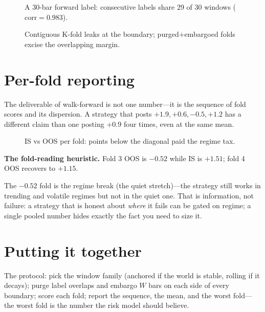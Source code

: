 \begin{figure}[htbp]\centering

\caption{A 30-bar forward label: consecutive labels share 29 of 30 windows
($\mathrm{corr}=0.983$).}
\label{fig:overlap}
\end{figure}

\begin{figure}[htbp]\centering

\caption{Contiguous K-fold leaks at the boundary; purged+embargoed folds excise the
overlapping margin.}
\label{fig:purge}
\end{figure}

\section{Per-fold reporting}\label{sec:folds}

The deliverable of walk-forward is not one number---it is the sequence of fold scores and
its dispersion. A strategy that posts $+1.9,+0.6,-0.5,+1.2$ has a different claim than
one posting $+0.9$ four times, even at the same mean.

\begin{figure}[htbp]\centering

\caption{IS vs OOS per fold: points below the diagonal paid the regime tax.}
\label{fig:folds}
\end{figure}

\begin{example}\label{ex:foldread}
\textbf{The fold-reading heuristic.} Fold 3 OOS is $-0.52$ while IS is $+1.51$; fold 4
OOS recovers to $+1.15$.
\begin{solution}
The $-0.52$ fold is the regime break (the quiet stretch)---the strategy still works in
trending and volatile regimes but not in the quiet one. That is information, not failure:
a strategy that is honest about \emph{where} it fails can be gated on regime; a single
pooled number hides exactly the fact you need to size it.
\end{solution}
\end{example}

\section{Putting it together}\label{sec:wfprotocol}

The protocol: pick the window family (anchored if the world is stable, rolling if it
decays); purge label overlaps and embargo $W$ bars on each side of every boundary;
score each fold; report the sequence, the mean, and the worst fold---the worst fold is
the number the risk model should believe.

